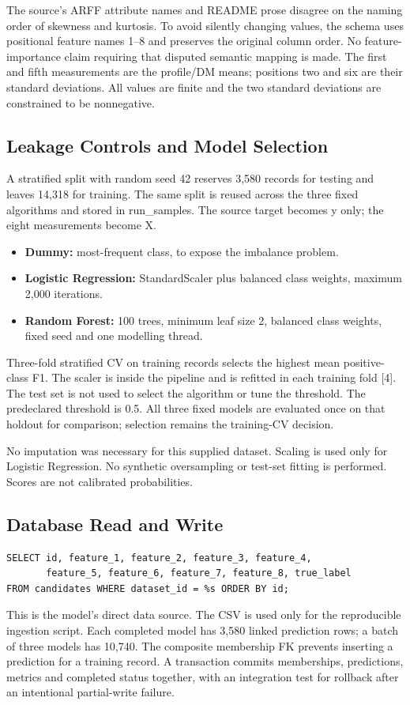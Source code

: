 \documentclass[11pt,a4paper]{article}
\begin{document}
The source's ARFF attribute names and README prose disagree on the naming order of skewness and kurtosis. To avoid silently changing values, the schema uses positional feature names 1--8 and preserves the original column order. No feature-importance claim requiring that disputed semantic mapping is made. The first and fifth measurements are the profile/DM means; positions two and six are their standard deviations. All values are finite and the two standard deviations are constrained to be nonnegative.

\subsection{Leakage Controls and Model Selection}
A stratified split with random seed 42 reserves 3,580 records for testing and leaves 14,318 for training. The same split is reused across the three fixed algorithms and stored in run\_samples. The source target becomes y only; the eight measurements become X.
\begin{itemize}
\item \textbf{Dummy:} most-frequent class, to expose the imbalance problem.
\item \textbf{Logistic Regression:} StandardScaler plus balanced class weights, maximum 2,000 iterations.
\item \textbf{Random Forest:} 100 trees, minimum leaf size 2, balanced class weights, fixed seed and one modelling thread.
\end{itemize}
Three-fold stratified CV on training records selects the highest mean positive-class F1. The scaler is inside the pipeline and is refitted in each training fold [4]. The test set is not used to select the algorithm or tune the threshold. The predeclared threshold is 0.5. All three fixed models are evaluated once on that holdout for comparison; selection remains the training-CV decision.

No imputation was necessary for this supplied dataset. Scaling is used only for Logistic Regression. No synthetic oversampling or test-set fitting is performed. Scores are not calibrated probabilities.

\subsection{Database Read and Write}
\begin{verbatim}
SELECT id, feature_1, feature_2, feature_3, feature_4,
       feature_5, feature_6, feature_7, feature_8, true_label
FROM candidates WHERE dataset_id = %s ORDER BY id;
\end{verbatim}
This is the model's direct data source. The CSV is used only for the reproducible ingestion script. Each completed model has 3,580 linked prediction rows; a batch of three models has 10,740. The composite membership FK prevents inserting a prediction for a training record. A transaction commits memberships, predictions, metrics and completed status together, with an integration test for rollback after an intentional partial-write failure.
\end{document}
